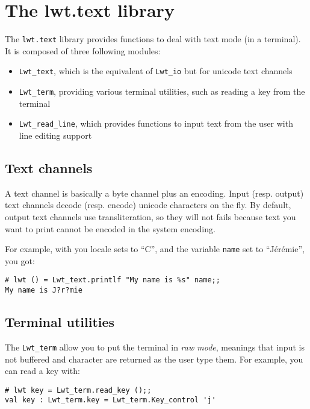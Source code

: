 \documentclass{article}
\begin{document}
\section{The lwt.text library}

The \texttt{lwt.text} library provides functions to deal with text
mode (in a terminal). It is composed of three following modules:

\begin{itemize}
\item \texttt{Lwt\_text}, which is the equivalent of \texttt{Lwt\_io}
  but for unicode text channels
\item \texttt{Lwt\_term}, providing various terminal utilities, such as
  reading a key from the terminal
\item \texttt{Lwt\_read\_line}, which provides functions to input text
  from the user with line editing support
\end{itemize}

\subsection{Text channels}

A text channel is basically a byte channel plus an encoding. Input
(resp. output) text channels decode (resp. encode) unicode characters
on the fly. By default, output text channels use transliteration, so
they will not fails because text you want to print cannot be encoded
in the system encoding.

For example, with you locale sets to ``C'', and the variable
\texttt{name} set to ``Jérémie'', you got:

\begin{verbatim}
# lwt () = Lwt_text.printlf "My name is %s" name;;
My name is J?r?mie
\end{verbatim}

\subsection{Terminal utilities}

The \texttt{Lwt\_term} allow you to put the terminal in \emph{raw
  mode}, meanings that input is not buffered and character are
returned as the user type them. For example, you can read a key with:

\begin{verbatim}
# lwt key = Lwt_term.read_key ();;
val key : Lwt_term.key = Lwt_term.Key_control 'j'
\end{verbatim}
\end{document}
